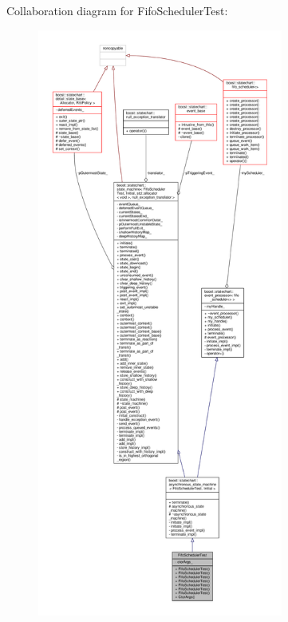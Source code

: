 Collaboration diagram for Fifo\+Scheduler\+Test\+:
\nopagebreak
\begin{figure}[H]
\begin{center}
\leavevmode
\includegraphics[height=550pt]{struct_fifo_scheduler_test__coll__graph}
\end{center}
\end{figure}
